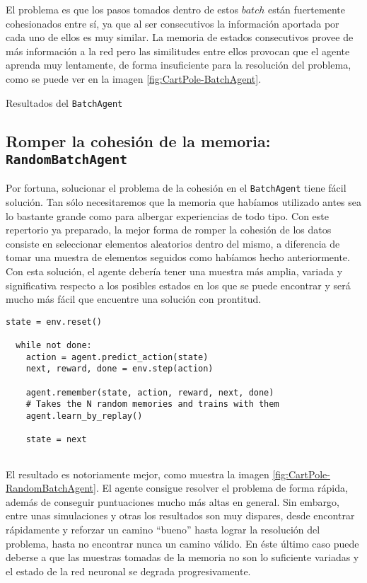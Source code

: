 El problema es que los pasos tomados dentro de estos $batch$ están fuertemente cohesionados entre sí, ya que al ser consecutivos la información aportada por cada uno de ellos es muy similar. La memoria de estados consecutivos provee de más información a la red pero las similitudes entre ellos provocan que el agente aprenda muy lentamente, de forma insuficiente para la resolución del problema, como se puede ver en la imagen \ref{fig:CartPole-BatchAgent}.

%
       {Resultados del \texttt{BatchAgent}}


\subsection{Romper la cohesión de la memoria: \texttt{RandomBatchAgent}}
\label{sec:cartpoledqn3}

Por fortuna, solucionar el problema de la cohesión en el \texttt{BatchAgent} tiene fácil solución. Tan sólo necesitaremos que la memoria que habíamos utilizado antes sea lo bastante grande como para albergar experiencias de todo tipo. Con este repertorio ya preparado, la mejor forma de romper la cohesión de los datos consiste en seleccionar elementos aleatorios dentro del mismo, a diferencia de tomar una muestra de elementos seguidos como habíamos hecho anteriormente. Con esta solución, el agente debería tener una muestra más amplia, variada y significativa respecto a los posibles estados en los que se puede encontrar y será mucho más fácil que encuentre una solución con prontitud.
  
\begin{minipage}{0.9\linewidth}%
\begin{lstlisting}[frame=tb, caption=Pseudocódigo RandomBatchAgent, inputencoding=latin1, label=code:cartpole_drl3]
  state = env.reset()

  while not done:
    action = agent.predict_action(state)
    next, reward, done = env.step(action)

    agent.remember(state, action, reward, next, done)
    # Takes the N random memories and trains with them
    agent.learn_by_replay()

    state = next
              
\end{lstlisting}%
\end{minipage}

El resultado es notoriamente mejor, como muestra la imagen \ref{fig:CartPole-RandomBatchAgent}. El agente consigue resolver el problema de forma rápida, además de conseguir puntuaciones mucho más altas en general. Sin embargo, entre unas simulaciones y otras los resultados son muy dispares, desde encontrar rápidamente y reforzar un camino ``bueno'' hasta lograr la resolución del problema, hasta no encontrar nunca un camino válido. En éste último caso puede deberse a que las muestras tomadas de la memoria no son lo suficiente variadas y el estado de la red neuronal se degrada progresivamente.

